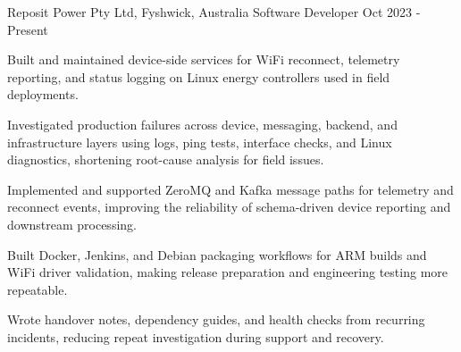 

\begin{cventries}

  \cventry
    {Reposit Power Pty Ltd, Fyshwick, Australia} %
    {Software Developer} %
    {} %
    {Oct 2023 - Present} %
    {
      \begin{cvitems} %
        \item {Built and maintained device-side services for WiFi reconnect, telemetry reporting, and status logging on Linux energy controllers used in field deployments.}
        \item {Investigated production failures across device, messaging, backend, and infrastructure layers using logs, ping tests, interface checks, and Linux diagnostics, shortening root-cause analysis for field issues.}
        \item {Implemented and supported ZeroMQ and Kafka message paths for telemetry and reconnect events, improving the reliability of schema-driven device reporting and downstream processing.}
        \item {Built Docker, Jenkins, and Debian packaging workflows for ARM builds and WiFi driver validation, making release preparation and engineering testing more repeatable.}
        \item {Wrote handover notes, dependency guides, and health checks from recurring incidents, reducing repeat investigation during support and recovery.}
      \end{cvitems}
    }


\end{cventries}
